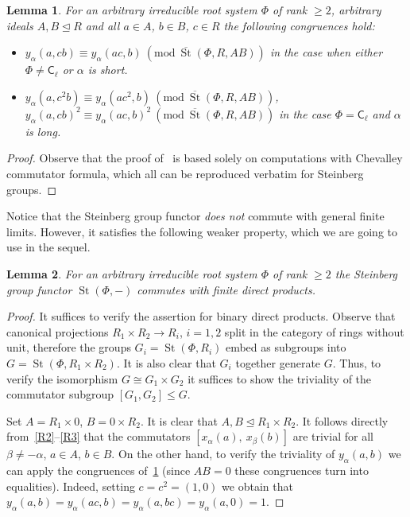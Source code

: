 \documentclass[oneside, 11pt]{amsart} \pdfoutput=1
\newcommand{\St}{\mathop{\mathrm{St}}\nolimits}
\numberwithin{equation}{section}
\newtheorem{lemma}{Lemma} \numberwithin{lemma}{section}
\theoremstyle{definition}
\newcommand{\rC}{\mathsf{C}}
\begin{document}
\begin{lemma} \label{lem:c-identities} For an arbitrary irreducible root system $\Phi$ of rank $\geq 2$, arbitrary ideals $A, B \trianglelefteq R$ and all $a \in A$, $b \in B$, $c \in R$ the following congruences hold:
\begin{itemize}
 \item $y_\alpha(a, cb) \equiv y_\alpha(ac, b)\ (\mathrm{mod}\ \overline{\St}(\Phi, R, AB))$ in the case when either $\Phi \neq \rC_{\ell}$ or $\alpha$ is short.
 \item $y_\alpha(a, c^2b) \equiv y_\alpha(ac^2, b)\ (\mathrm{mod}\ \overline{\St}(\Phi, R, AB))$, $y_\alpha(a, cb)^2 \equiv y_\alpha(ac, b)^2\ (\mathrm{mod}\ \overline{\St}(\Phi, R, AB))$ in the case $\Phi = \rC_{\ell}$ and $\alpha$ is long.
\end{itemize} \end{lemma}
\begin{proof}
 Observe that the proof of~\cite[Theorem~5]{VZ20} is based solely on computations with Chevalley commutator formula, which all can be reproduced verbatim for Steinberg groups.
\end{proof}

Notice that the Steinberg group functor {\it does not} commute with general finite limits. However, it satisfies the following weaker property, which we are going to use in the sequel.
\begin{lemma} \label{lem:fprod} For an arbitrary irreducible root system $\Phi$ of rank $\geq 2$ the Steinberg group functor $\St(\Phi, -)$ commutes with finite direct products. \end{lemma}
\begin{proof} 
It suffices to verify the assertion for binary direct products.
Observe that canonical projections $R_1 \times R_2 \to R_i$, $i=1,2$ split in the category of rings without unit, therefore the groups $G_i = \St(\Phi, R_i)$ embed as subgroups into $G = \St(\Phi, R_1 \times R_2)$. It is also clear that $G_i$ together generate $G$. Thus, to verify the isomorphism $G \cong G_1 \times G_2$ it suffices to show the triviality of the commutator subgroup $[G_1, G_2] \leq G$.

Set $A = R_1\times 0$, $B = 0 \times R_2$. It is clear that $A, B \trianglelefteq R_1 \times R_2$. 
It follows directly from~\eqref{R2}--\eqref{R3} that the commutators $[x_{\alpha}(a),\ x_\beta(b)]$ are trivial for all $\beta \neq -\alpha$, $a \in A$, $b\in B$. On the other hand, to verify the triviality of $y_\alpha(a, b)$ we can apply the congruences of~\cref{lem:c-identities} (since $AB=0$ these congruences turn into equalities).
Indeed, setting $c = c^2 = (1, 0)$ we obtain that $y_\alpha(a, b) = y_\alpha(ac, b) = y_\alpha(a, bc) = y_\alpha(a, 0) = 1$. \end{proof}
\end{document}
